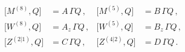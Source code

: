 \begin{equation}
\begin{aligned}
\big[ M^{(8)}, Q \big] &= A\, \Gamma Q\, , & 
  \big[ M^{(5)}, Q\big] &= B\, \Gamma Q\, ,\\[1ex]
\big[ W^{(8)}, Q \big] &= A_z\, \Gamma Q\, ,&
  \big[ W^{(5)}, Q\big] &= B_z\, \Gamma Q\, ,\\[1ex]
\big[ Z^{(2|1)}, Q\big] &= C\, \Gamma Q\, , &
  \big[ Z^{(4|2)}, Q\big] &= D\, \Gamma Q\, .
\end{aligned}
\end{equation}

